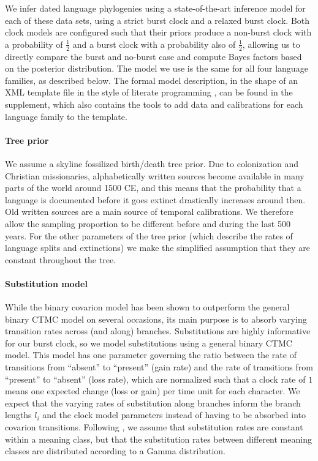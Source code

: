 \documentclass[]{rsos}%
\begin{document}
We infer dated language phylogenies using a state-of-the-art inference model for each of these data sets, using a strict burst clock and a relaxed burst clock.
Both clock models are configured such that their priors produce a non-burst clock with a
probability of $\frac{1}{2}$ and a burst clock with a probability also of
$\frac{1}{2}$, allowing us to directly compare the burst and no-burst case and compute Bayes factors based on the posterior
distribution.
The model we use is the same for all four language families, as described below.
The formal model description, in the shape of an XML template file in the
style of literate programming \parencite{knuth1984literate}, can be found in the supplement,
which also contains the tools to add data and calibrations for each language
family to the template. 

\paragraph{Tree prior}
We assume a skyline fossilized birth/death tree prior.
Due to colonization and Christian missionaries,
alphabetically written sources become available in many parts of the world around
1500 CE, and this means that the probability that a language is documented before
it goes extinct drastically increases around then. Old written sources are a
main source of temporal calibrations.
We therefore allow the sampling proportion to be different before and during the last 500 years.
For the other parameters of the tree prior (which describe the rates of language splits and extinctions) we make the simplified assumption that they are constant throughout the tree.


\paragraph{Substitution model}

While the binary covarion model has been shown to outperform the general binary CTMC
model on several occasions, its main purpose is to absorb varying transition
rates across (and along) branches. Substitutions are highly informative for our burst clock,
so we model substitutions using a general binary CTMC model.
This model has one parameter governing the ratio 
between the rate of transitions from “absent” to “present” (gain rate)
and the rate of transitions from “present” to “absent” (loss rate),
which are normalized such that a clock rate of $1$ means one expected
change (loss or gain) per time unit for each character.
We expect that the varying
rates of substitution along branches inform the branch lengths $l_i$
and the clock model parameters instead of having to be absorbed into covarion transitions.
Following \textcite{maurits2017beastling}, we assume that substitution rates are constant within a
meaning class, but that the substitution rates between different meaning classes
are distributed according to a Gamma distribution.
\end{document}

